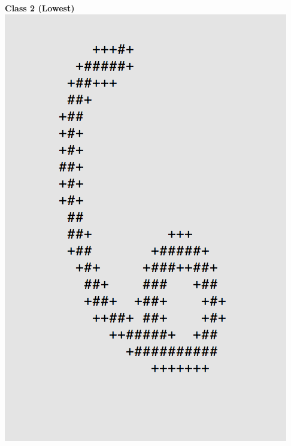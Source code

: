\documentclass[11pt]{article}
\begin{document}
\begin{center}
\begin{multicols}{2}
\textbf{Class 2 (Lowest)}\\
\includegraphics[scale=0.4]{part1/1/low_2.png}
\end{multicols}
\end{center}
\end{document}
